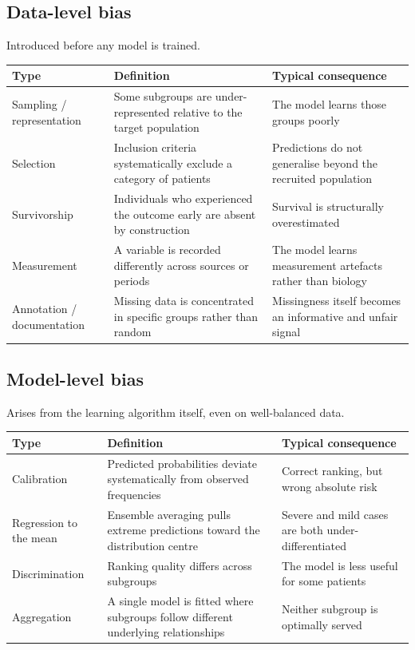 \documentclass[11pt,a4paper]{article}
\begin{document}
\subsection{Data-level bias}

Introduced before any model is trained.

\begin{longtable}{@{}p{3.6cm} p{5.5cm} p{5.5cm}@{}}
\toprule
\textbf{Type} & \textbf{Definition} & \textbf{Typical consequence} \\
\midrule
\endhead
Sampling / representation & Some subgroups are under-represented relative to the target
population & The model learns those groups poorly \\
\addlinespace
Selection & Inclusion criteria systematically exclude a category of patients & Predictions do
not generalise beyond the recruited population \\
\addlinespace
Survivorship & Individuals who experienced the outcome early are absent by construction &
Survival is structurally overestimated \\
\addlinespace
Measurement & A variable is recorded differently across sources or periods & The model learns
measurement artefacts rather than biology \\
\addlinespace
Annotation / documentation & Missing data is concentrated in specific groups rather than random
& Missingness itself becomes an informative and unfair signal \\
\bottomrule
\end{longtable}

\subsection{Model-level bias}

Arises from the learning algorithm itself, even on well-balanced data.

\begin{longtable}{@{}p{3.6cm} p{5.5cm} p{5.5cm}@{}}
\toprule
\textbf{Type} & \textbf{Definition} & \textbf{Typical consequence} \\
\midrule
\endhead
Calibration & Predicted probabilities deviate systematically from observed frequencies &
Correct ranking, but wrong absolute risk \\
\addlinespace
Regression to the mean & Ensemble averaging pulls extreme predictions toward the distribution
centre & Severe and mild cases are both under-differentiated \\
\addlinespace
Discrimination & Ranking quality differs across subgroups & The model is less useful for some
patients \\
\addlinespace
Aggregation & A single model is fitted where subgroups follow different underlying
relationships & Neither subgroup is optimally served \\
\bottomrule
\end{longtable}
\end{document}

